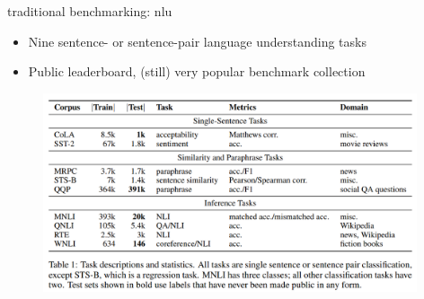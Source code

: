 
\begin{vbframe}{traditional benchmarking: nlu}

\vfill

\begin{itemize}
	\item Nine sentence- or sentence-pair language understanding tasks
	\item Public leaderboard, (still) very popular benchmark collection
\end{itemize}

	\begin{figure}
		\centering
		\includegraphics[width = 11cm]{figure/glue.png}\\ 
	\end{figure}

\vfill

\end{vbframe}


